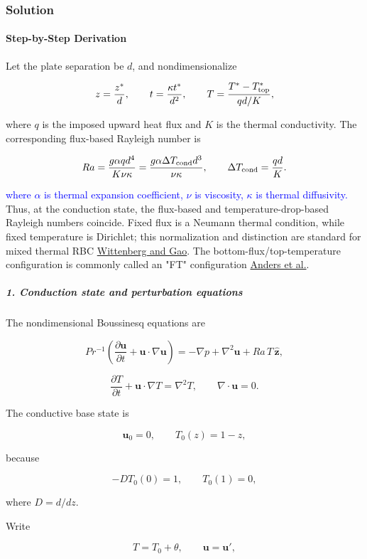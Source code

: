 \subsubsection*{Solution}
\paragraph*{Step-by-Step Derivation}

Let the plate separation be $d$, and nondimensionalize

\[
z=\frac{z^\ast}{d},\qquad t=\frac{\kappa t^\ast}{d^2},\qquad T=\frac{T^\ast-T^\ast_{\rm top}}{q d/K},
\]

where $q$ is the imposed upward heat flux and $K$ is the thermal conductivity. The corresponding flux-based Rayleigh number is

\[
Ra=\frac{g\alpha qd^4}{K\nu\kappa} =\frac{g\alpha \Delta T_{\rm cond}d^3}{\nu\kappa}, \qquad \Delta T_{\rm cond}=\frac{qd}{K}.
\]

\textcolor{blue}{where $\alpha$ is thermal expansion coefficient, $\nu$ is viscosity, $\kappa$ is thermal diffusivity.} Thus, at the conduction state, the flux-based and temperature-drop-based Rayleigh numbers coincide. Fixed flux is a Neumann thermal condition, while fixed temperature is Dirichlet; this normalization and distinction are standard for mixed thermal RBC \href{\detokenize{https://www.sfu.ca/~rwwitten/papers/WittenbergGao_epjb2010.pdf}}{Wittenberg and Gao}. The bottom-flux/top-temperature configuration is commonly called an "FT" configuration \href{\detokenize{https://arxiv.org/abs/2003.00026}}{Anders et al.}.

\subparagraph*{1. Conduction state and perturbation equations}

The nondimensional Boussinesq equations are

\[
Pr^{-1}\left(\frac{\partial\mathbf u}{\partial t} +\mathbf u\cdot\nabla\mathbf u\right) =-\nabla p+\nabla^2\mathbf u+Ra\,T\,\hat{\mathbf z},
\]

\[
\frac{\partial T}{\partial t}+\mathbf u\cdot\nabla T=\nabla^2T, \qquad \nabla\cdot\mathbf u=0.
\]

The conductive base state is

\[
\mathbf u_0=0,\qquad T_0(z)=1-z,
\]

because

\[
-DT_0(0)=1,\qquad T_0(1)=0,
\]

where $D=d/dz$.

Write

\[
T=T_0+\theta,\qquad \mathbf u=\mathbf u',
\]

